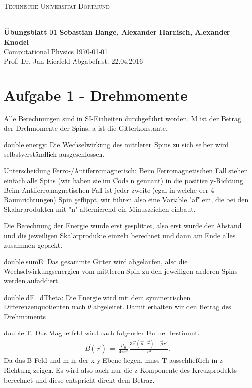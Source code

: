

\noindent
\centerline{\small{\textsc{Technische Universität Dortmund}}} \\
\large\textbf{Übungsblatt 01} \hfill \footnotesize\textbf{Sebastian Bange, Alexander Harnisch, Alexander Knodel} \\
\normalsize Computational Physics \hfill \today \\
Prof. Dr. Jan Kierfeld \hfill Abgabefrist: 22.04.2016\\
\noindent\makebox[\linewidth]{\rule{\textwidth}{0.4pt}}
\section{Aufgabe 1 - Drehmomente}
Alle Berechnungen sind in SI-Einheiten durchgeführt worden.
M ist der Betrag der Drehmomente der Spins, a ist die Gitterkonstante.

double energy:
Die Wechselwirkung des mittleren Spins zu sich selber wird selbstverständlich ausgeschlossen.

Unterscheidung Ferro-/Antiferromagnetisch: Beim Ferromagnetischen Fall stehen einfach alle Spins (wir haben sie im Code n gennant) in die positive y-Richtung.
Beim Antiferromagnetischen Fall ist jeder zweite (egal in welche der 4 Raumrichtungen) Spin geflippt, wir führen also eine Variable "af" ein, die bei den Skalarprodukten mit "n" alternierend ein Minuszeichen einbaut.

Die Berechnung der Energie wurde erst gesplittet, also erst wurde der Abstand und die jeweiligen Skalarprodukte einzeln berechnet und dann am Ende alles zusammen gepackt.


double sumE:
Das gesammte Gitter wird abgelaufen, also die Wechselwirkungsenergien vom mittleren Spin zu den jeweiligen anderen Spins werden aufaddiert.

double dE\_dTheta:
Die Energie wird mit dem symmetrischen Differenzenquotienten nach $\theta$ abgeleitet.
Damit erhalten wir den Betrag des Drehmoments

double T:
Das Magnetfeld wird nach folgender Formel bestimmt:
\begin{align*}
	\vec{B}(\vec{r})\,=\,\frac{\mu_0}{4 \pi r^2}\,\frac{3\vec{r}(\vec{\mu}\cdot\vec{r}) - \vec{\mu}r^2}{r^3}.
\end{align*}
Da das B-Feld und m in der x-y-Ebene liegen, muss T ausschließlich in z-Richtung zeigen.
Es wird also auch nur die z-Komponente des Kreuzprodukts berechnet und diese entspricht direkt dem Betrag.


